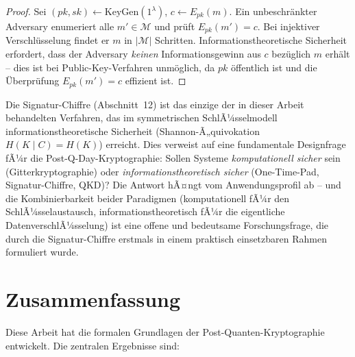 ﻿\documentclass[a4paper,12pt]{article}
\theoremstyle{definition}
\begin{document}
\begin{proof}
Sei $(pk, sk) \leftarrow \mathrm{KeyGen}(1^\lambda)$,
$c \leftarrow E_{pk}(m)$. Ein unbeschr\"ankter Adversary enumeriert
alle $m' \in \mathcal{M}$ und pr\"uft $E_{pk}(m') = c$.
Bei injektiver Verschl\"usselung findet er $m$ in $|\mathcal{M}|$
Schritten. Informationstheoretische Sicherheit erfordert, dass der
Adversary \emph{keinen} Informationsgewinn aus $c$ bez\"uglich $m$
erh\"alt -- dies ist bei Public-Key-Verfahren unm\"oglich, da $pk$
\"offentlich ist und die \"Uberpr\"ufung $E_{pk}(m') = c$
effizient ist.
\end{proof}

Die Signatur-Chiffre (Abschnitt~12) ist das einzige der in dieser
Arbeit behandelten Verfahren, das im symmetrischen SchlÃ¼sselmodell
informationstheoretische Sicherheit (Shannon-Ã„quivokation
$H(K \mid C) = H(K)$) erreicht. Dies verweist auf eine fundamentale
Designfrage fÃ¼r die Post-Q-Day-Kryptographie: Sollen Systeme
\emph{komputationell sicher} sein (Gitterkryptographie) oder
\emph{informationstheoretisch sicher} (One-Time-Pad, Signatur-Chiffre,
QKD)? Die Antwort hÃ¤ngt vom Anwendungsprofil ab -- und die
Kombinierbarkeit beider Paradigmen (komputationell fÃ¼r den
SchlÃ¼sselaustausch, informationstheoretisch fÃ¼r die eigentliche
DatenverschlÃ¼sselung) ist eine offene und bedeutsame
Forschungsfrage, die durch die Signatur-Chiffre erstmals
in einem praktisch einsetzbaren Rahmen formuliert wurde.

\section{Zusammenfassung}

Diese Arbeit hat die formalen Grundlagen der Post-Quanten-Kryptographie
entwickelt. Die zentralen Ergebnisse sind:
\end{document}
